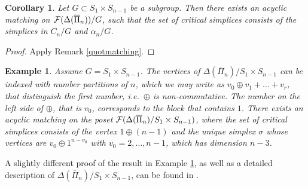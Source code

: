\documentclass{elsarticle}
\newtheorem{cor}[df]{Corollary}
\newtheorem{ex}[df]{Example}
\begin{document}
\begin{cor}
\label{moeglichkeit1}
Let $G\subset S_1\times S_{n-1}$ be a subgroup. Then there exists an acyclic matching on ${\cal F}(\Delta(\overline{\Pi}_n))/G$, such that the set of critical simplices consists of the simplices in $C_n/G$ and $\alpha_n/G$.
\end{cor}
\begin{proof}
Apply Remark \ref{quotmatching}.
\end{proof}
\begin{ex}
\label{nicematchingex}
Assume $G=S_1\times S_{n-1}$. The vertices of $\Delta(\overline{\Pi}_n)/S_1\times S_{n-1}$ can be indexed with number partitions of $n$, which we may write as $v_0\oplus v_1+\dots+v_r$, that distinguish the first number, i.e.\ $\oplus$ is non-commutative. The number on the left side of $\oplus$, that is $v_0$, corresponds to the block that contains $1$. There exists an acyclic matching on the poset ${\cal F}(\Delta(\overline{\Pi}_n)/S_1\times S_{n-1})$, where the set of critical simplices consists of the vertex $1\oplus(n-1)$ and the unique simplex $\sigma$ whose vertices are $v_0\oplus 1^{n-v_0}$ with $v_0=2,\dots,n-1$, which has dimension $n-3$.
\end{ex}
A slightly different proof of the result in Example \ref{nicematchingex}, as well as a detailed description of $\Delta(\overline{\Pi}_n)/S_1\times S_{n-1}$, can be found in \cite{donau2}.
\end{document}
